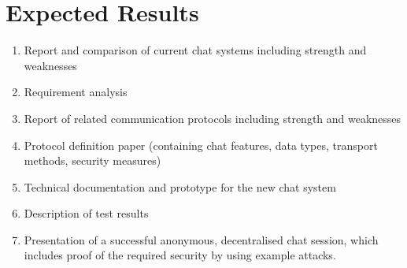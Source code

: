 \section{Expected Results}
\begin{enumerate}
\item Report and comparison of current chat systems including strength and weaknesses
\item Requirement analysis
\item Report of related communication protocols including strength and weaknesses
\item Protocol definition paper (containing chat features, data types, transport methods, security measures)
\item Technical documentation and prototype for the new chat system
\item Description of test results
\item Presentation of a successful anonymous, decentralised chat session, which includes proof of the required security by using example attacks.
\end{enumerate}

